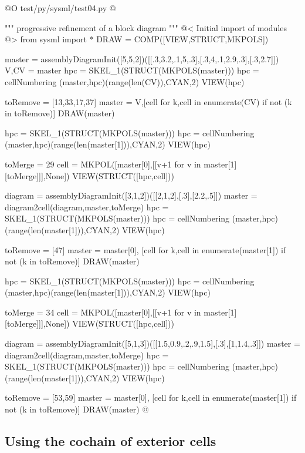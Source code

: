\documentclass[11pt,oneside]{article}	%
\begin{document}
@O test/py/sysml/test04.py
@{""" progressive refinement of a block diagram """
@< Initial import of modules @>
from sysml import *
DRAW = COMP([VIEW,STRUCT,MKPOLS])

master = assemblyDiagramInit([5,5,2])([[.3,3.2,.1,5,.3],[.3,4,.1,2.9,.3],[.3,2.7]])
V,CV = master
hpc = SKEL_1(STRUCT(MKPOLS(master)))
hpc = cellNumbering (master,hpc)(range(len(CV)),CYAN,2)
VIEW(hpc)

toRemove = [13,33,17,37]
master = V,[cell for k,cell in enumerate(CV) if not (k in toRemove)]
DRAW(master)

hpc = SKEL_1(STRUCT(MKPOLS(master)))
hpc = cellNumbering (master,hpc)(range(len(master[1])),CYAN,2)
VIEW(hpc)

toMerge = 29
cell = MKPOL([master[0],[[v+1 for v in  master[1][toMerge]]],None])
VIEW(STRUCT([hpc,cell]))

diagram = assemblyDiagramInit([3,1,2])([[2,1,2],[.3],[2.2,.5]])
master = diagram2cell(diagram,master,toMerge)
hpc = SKEL_1(STRUCT(MKPOLS(master)))
hpc = cellNumbering (master,hpc)(range(len(master[1])),CYAN,2)
VIEW(hpc)

toRemove = [47]
master = master[0], [cell for k,cell in enumerate(master[1]) if not (k in toRemove)]
DRAW(master)

hpc = SKEL_1(STRUCT(MKPOLS(master)))
hpc = cellNumbering (master,hpc)(range(len(master[1])),CYAN,2)
VIEW(hpc)

toMerge = 34
cell = MKPOL([master[0],[[v+1 for v in  master[1][toMerge]]],None])
VIEW(STRUCT([hpc,cell]))

diagram = assemblyDiagramInit([5,1,3])([[1.5,0.9,.2,.9,1.5],[.3],[1,1.4,.3]])
master = diagram2cell(diagram,master,toMerge)
hpc = SKEL_1(STRUCT(MKPOLS(master)))
hpc = cellNumbering (master,hpc)(range(len(master[1])),CYAN,2)
VIEW(hpc)

toRemove = [53,59]
master = master[0], [cell for k,cell in enumerate(master[1]) if not (k in toRemove)]
DRAW(master)
@}

\subsection{Using the cochain of exterior cells}
\label{sec:exterior}
\end{document}
